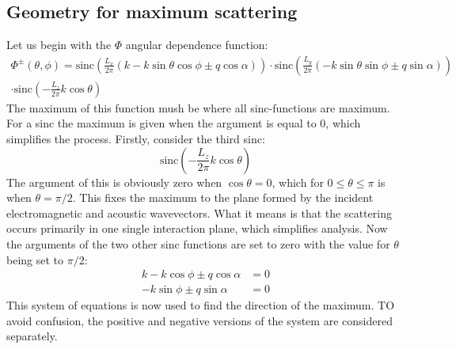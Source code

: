 \documentclass[10pt,a4paper,draft]{scrartcl}
\begin{document}
	\subsection{Geometry for maximum scattering \label{app:braggmax}}
	Let us begin with the $\Phi$ angular dependence function:
	\begin{multline*}
	\Phi^\pm(\theta,\phi) = \text{sinc} \left( \frac{L_x}{2\pi} \left( k - k\sin{\theta}\cos{\phi} \pm q\cos{\alpha} \right) \right) 
	\cdot \text{sinc} \left( \frac{L_y}{2\pi} \left( -k\sin{\theta}\sin{\phi} \pm q\sin{\alpha} \right) \right) \\
	\cdot \text{sinc} \left( -\frac{L_z}{2\pi} k\cos{\theta} \right)
	\end{multline*}
	The maximum of this function mush be where all sinc-functions are maximum. For a sinc the maximum is given when the argument is equal to 0, which simplifies the process. Firstly, consider the third sinc:
	\begin{equation*}
		\text{sinc} \left( -\frac{L_z}{2\pi} k\cos{\theta} \right)
	\end{equation*}
	The argument of this is obviously zero when $\cos{\theta} = 0$, which for $0 \leq \theta \leq \pi$ is when $\theta = \pi/2$. This fixes the maximum to the plane formed by the incident electromagnetic and acoustic wavevectors. What it means is that the scattering occurs primarily in one single interaction plane, which simplifies analysis. Now the arguments of the two other sinc functions are set to zero with the value for $\theta$ being set to $\pi/2$:
	\begin{align}
		k - k\cos{\phi} \pm q\cos{\alpha} &= 0 \label{eq:bragg-sinc1} \\
		-k\sin{\phi} \pm q\sin{\alpha} &= 0 \label{eq:bragg-sinc2}
	\end{align}
	This system of equations is now used to find the direction of the maximum. TO avoid confusion, the positive and negative versions of the system are considered separately.
	
\end{document}
